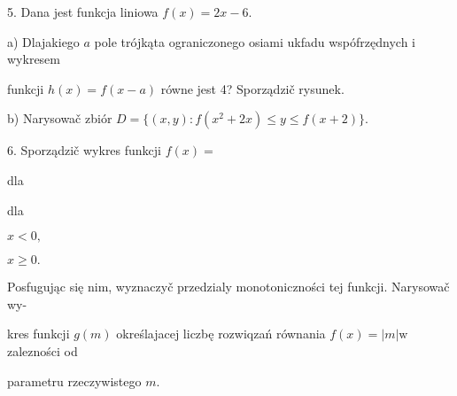 \documentclass[a4paper,12pt]{article}
\begin{document}
5. Dana jest funkcja liniowa $f(x)=2x-6.$

a) Dlajakiego $a$ pole trójkąta ograniczonego osiami ukfadu wspófrzędnych $\mathrm{i}$ wykresem

funkcji $h(x)=f(x-a)$ równe jest 4? Sporządzič rysunek.

b) Narysowač zbiór $D=\{(x,y):f(x^{2}+2x)\leq y\leq f(x+2)\}.$

6. Sporządzič wykres funkcji $f(x)=$

dla

dla

$x<0,$

$x\geq 0.$

Posfugując się nim, wyznaczyč przedzialy monotoniczności tej funkcji. Narysowač wy-

kres funkcji $g(m)$ określajacej liczbę rozwiqzań równania $f(x)=|m| \mathrm{w}$ zalezności od

parametru rzeczywistego $m.$
\end{document}
